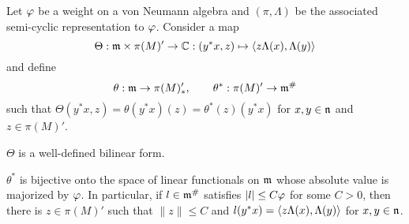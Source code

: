 \documentclass{../../small}
\begin{document}
\begin{prop}
Let $\varphi$ be a weight on a von Neumann algebra and $(\pi,\Lambda)$ be the associated semi-cyclic representation to $\varphi$.
Consider a map
\[\Theta:\mathfrak{m}\times\pi(M)'\to\mathbb{C}:(y^*x,z)\mapsto\langle z\Lambda(x),\Lambda(y)\rangle\]
and define
\[\theta:\mathfrak{m}\to\pi(M)'_*,\qquad\theta^*:\pi(M)'\to\mathfrak{m}^\#\]
such that $\Theta(y^*x,z)=\theta(y^*x)(z)=\theta^*(z)(y^*x)$ for $x,y\in\mathfrak{n}$ and $z\in\pi(M)'$.
\begin{parts}
\item $\Theta$ is a well-defined bilinear form.
\item $\theta^*$ is bijective onto the space of linear functionals on $\mathfrak{m}$ whose absolute value is majorized by $\varphi$.
In particular, if $l\in\mathfrak{m}^\#$ satisfies $|l|\le C\varphi$ for some $C>0$, then there is $z\in\pi(M)'$ such that $\|z\|\le C$ and $l(y^*x)=\langle z\Lambda(x),\Lambda(y)\rangle$ for $x,y\in\mathfrak{n}$.
\end{parts}
\end{prop}
\end{document}
